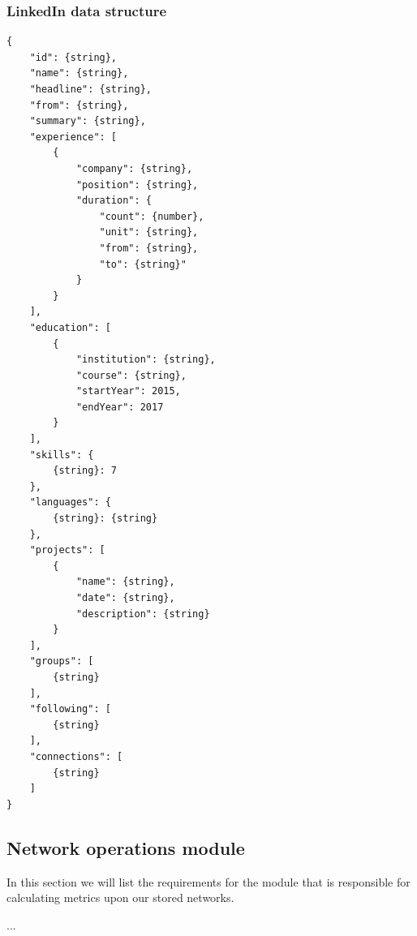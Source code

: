 \subsubsection{LinkedIn data structure}
\begin{verbatim}
{
    "id": {string},
    "name": {string},
    "headline": {string},
    "from": {string},
    "summary": {string},
    "experience": [
        {
            "company": {string},
            "position": {string},
            "duration": {
                "count": {number},
                "unit": {string},
                "from": {string},
                "to": {string}"
            }
        }
    ],
    "education": [
        {
            "institution": {string},
            "course": {string},
            "startYear": 2015,
            "endYear": 2017
        }
    ],
    "skills": {
        {string}: 7
    },
    "languages": {
        {string}: {string}
    },
    "projects": [
        {
            "name": {string},
            "date": {string},
            "description": {string}
        }
    ],
    "groups": [
        {string}
    ],
    "following": [
        {string}
    ],
    "connections": [
        {string}
    ]
}
\end{verbatim}

\subsection{Network operations module}
In this section we will list the requirements for the module that is responsible for calculating metrics upon
our stored networks.

...

